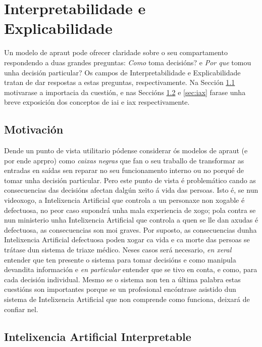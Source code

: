 \section{Interpretabilidade e Explicabilidade}
\label{sec:interpretabilidade_e}

Un modelo de \acrshort{apraut} pode ofrecer claridade sobre o seu compartamento respondendo a duas grandes preguntas: \textit{Como} toma decisións? e \textit{Por que} tomou unha decisión particular? Os campos de Interpretabilidade e Explicabilidade tratan de dar respostas a estas preguntas, respectivamente. Na Sección \ref{sec:mot_iai_iax} motivarase a importacia da cuestión, e nas Seccións \ref{sec:iai} e \ref{sec:iax} farase unha breve exposición dos conceptos de \acrfull{iai} e \acrfull{iax} respectivamente.

\subsection{Motivación}
\label{sec:mot_iai_iax}

Dende un punto de vista utilitario pódense considerar ós modelos de \acrshort{apraut} (e por ende \acrshort{aprpro}) como \emph{caixas negras} que fan o seu traballo de transformar as entradas en saídas sen reparar no seu funcionamento interno ou no porqué de tomar unha decisión particular. Pero este punto de vista é problemático cando as consecuencias das decisións afectan dalgún xeito á vida das persoas. Isto é, se nun videoxogo, a Intelixencia Artificial que controla a un personaxe non xogable é defectuosa, no peor caso supondrá unha mala experiencia de xogo; pola contra se nun ministerio unha Intelixencia Artificial que controla a quen se lle dan axudas é defectuosa, as consecuencias son moi graves. Por suposto, as consecuencias dunha Intelixencia Artificial defectuosa poden xogar ca vida e ca morte das persoas se trátase dun sistema de triaxe médico. Neses casos será necesario, \emph{en xeral} entender que ten presente o sistema para tomar decisións e como manipula devandita información e \emph{en particular} entender que se tivo en conta, e como, para cada decisión individual. Mesmo se o sistema non ten a última palabra estas cuestións son importantes porque se un profesional encóntrase asistido dun sistema de Intelixencia Artificial que non comprende como funciona, deixará de confiar nel.

\subsection{Intelixencia Artificial Interpretable}
\label{sec:iai}

